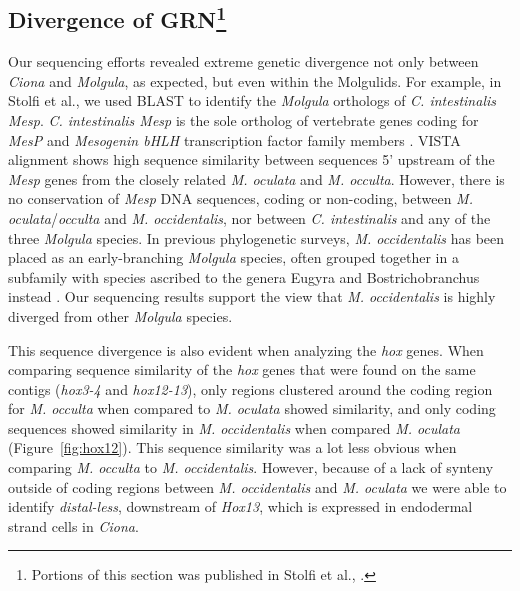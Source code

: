 \subsection[title]{Divergence of GRN\footnote{Portions of this section was published in Stolfi et al., \cite{stolfi_guidelines_2014}.}}
Our sequencing efforts revealed extreme genetic divergence not only between \textit{Ciona} and \textit{Molgula}, as expected, but even within the Molgulids. For example, in Stolfi et al., \cite{stolfi_divergent_2014} we used BLAST to identify the \textit{Molgula} orthologs of \textit{C. intestinalis Mesp}. %
\textit{C. intestinalis Mesp} is the sole ortholog of vertebrate genes coding for \textit{MesP} and \textit{Mesogenin bHLH} transcription factor family members \cite{satou_improved_2008}. VISTA alignment shows high sequence similarity between sequences 5' upstream of the \textit{Mesp} genes from the closely related \textit{M. oculata} and \textit{M. occulta}. However, there is no conservation of \textit{Mesp} DNA sequences, coding or non-coding, between \textit{M. oculata}/\textit{occulta} and \textit{M. occidentalis}, nor between \textit{C. intestinalis} and any of the three \textit{Molgula} species. In previous phylogenetic surveys, \textit{M. occidentalis} has been placed as an early-branching \textit{Molgula} species, often grouped together in a subfamily with species ascribed to the genera Eugyra and Bostrichobranchus instead \cite{hadfield_multiple_1995,huber_evolution_2000,tsagkogeorga_updated_2009}. Our sequencing results support the view that \textit{M. occidentalis} is highly diverged from other \textit{Molgula} species.

This sequence divergence is also evident when analyzing the \textit{hox} genes. When comparing sequence similarity of the \textit{hox} genes that were found on the same contigs (\textit{hox3-4} and \textit{hox12-13}), only regions clustered around the coding region for \textit{M. occulta} when compared to \textit{M. oculata} showed similarity, and only coding sequences showed similarity in \textit{M. occidentalis} when compared \textit{M. oculata} (Figure~\ref{fig:hox12}). This sequence similarity was a lot less obvious when comparing \textit{M. occulta} to \textit{M. occidentalis}. However, because of a lack of synteny outside of coding regions between \textit{M. occidentalis} and \textit{M. oculata} we were able to identify \textit{distal-less}, downstream of \textit{Hox13}, which is expressed in endodermal strand cells in \textit{Ciona}.

